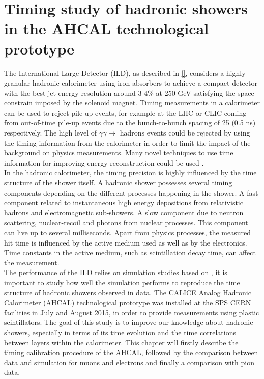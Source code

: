 \chapter{Timing study of hadronic showers in the AHCAL technological prototype}
\label{chap:TimingAHCAL}

The International Large Detector (ILD), as described in \ref{}, considers a highly granular hadronic calorimeter using iron absorbers to achieve a compact detector with the best jet energy resolution around 3-4\% at 250 GeV satisfying the space constrain imposed by the solenoid magnet. Timing measurements in a calorimeter can be used to reject pile-up events, for example at the LHC or CLIC coming from out-of-time pile-up events due to the bunch-to-bunch spacing of 25 (0.5 ns) respectively. The high level of $\gamma\gamma \rightarrow$ hadrons events could be rejected by using the timing information from the calorimeter in order to limit the impact of the background on physics measurements. Many novel techniques to use time information for improving energy reconstruction could be used \cite{Benaglia2016}.\\

In the hadronic calorimeter, the timing precision is highly influenced by the time structure of the shower itself. A hadronic shower possesses several timing components depending on the different processes happening in the shower. A fast component related to instantaneous high energy depositions from relativistic hadrons and electromagnetic sub-showers. A slow component due to neutron scattering, nuclear-recoil and photons from nuclear processes. This component can live up to several milliseconds. Apart from physics processes, the measured hit time is influenced by the active medium used as well as by the electronics. Time constants in the active medium, such as scintillation decay time, can affect the measurement.\\

The performance of the ILD relies on simulation studies based on \geant, it is important to study how well the simulation performs to reproduce the time structure of hadronic showers observed in data. The CALICE Analog Hadronic Calorimeter (AHCAL) technological prototype was installed at the SPS CERN facilities in July and August 2015, in order to provide measurements using plastic scintillators. The goal of this study is to improve our knowledge about hadronic showers, especially in terms of its time evolution and the time correlations between layers within the calorimeter. This chapter will firstly describe the timing calibration procedure of the AHCAL, followed by the comparison between data and simulation for muons and electrons and finally a comparison with pion data.

